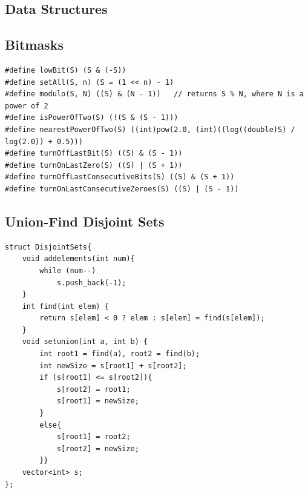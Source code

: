 \documentclass[10pt,landscape]{article}
\begin{document}
\begin{multicols}{2}
\setcounter{page}{1}
\pagestyle{fancy}
\tableofcontents
\newpage

\section{Data Structures}
\subsection{Bitmasks}
\begin{lstlisting}
#define lowBit(S) (S & (-S))
#define setAll(S, n) (S = (1 << n) - 1)
#define modulo(S, N) ((S) & (N - 1))   // returns S % N, where N is a power of 2
#define isPowerOfTwo(S) (!(S & (S - 1)))
#define nearestPowerOfTwo(S) ((int)pow(2.0, (int)((log((double)S) / log(2.0)) + 0.5)))
#define turnOffLastBit(S) ((S) & (S - 1))
#define turnOnLastZero(S) ((S) | (S + 1))
#define turnOffLastConsecutiveBits(S) ((S) & (S + 1))
#define turnOnLastConsecutiveZeroes(S) ((S) | (S - 1))
\end{lstlisting}

\subsection{Union-Find Disjoint Sets}
\begin{lstlisting}
struct DisjointSets{
	void addelements(int num){
		while (num--)
			s.push_back(-1);
    }
	int find(int elem) {
		return s[elem] < 0 ? elem : s[elem] = find(s[elem]); 
	}
	void setunion(int a, int b) {
		int root1 = find(a), root2 = find(b);
		int newSize = s[root1] + s[root2];
		if (s[root1] <= s[root2]){
			s[root2] = root1;
			s[root1] = newSize;
		}
		else{
			s[root1] = root2;
			s[root2] = newSize;
		}}
    vector<int> s;
};
\end{lstlisting}


\end{multicols}
\end{document}
